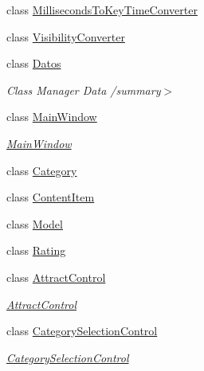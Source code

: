 \begin{DoxyCompactItemize}
\item 
class \hyperlink{class_microsoft_1_1_samples_1_1_kinect_1_1_basic_interactions_1_1_milliseconds_to_key_time_converter}{Milliseconds\-To\-Key\-Time\-Converter}
\item 
class \hyperlink{class_microsoft_1_1_samples_1_1_kinect_1_1_basic_interactions_1_1_visibility_converter}{Visibility\-Converter}
\item 
class \hyperlink{class_microsoft_1_1_samples_1_1_kinect_1_1_basic_interactions_1_1_datos}{Datos}
\begin{DoxyCompactList}\small\item\em Class Manager Data /summary$>$ \end{DoxyCompactList}\item 
class \hyperlink{class_microsoft_1_1_samples_1_1_kinect_1_1_basic_interactions_1_1_main_window}{Main\-Window}
\begin{DoxyCompactList}\small\item\em \hyperlink{class_microsoft_1_1_samples_1_1_kinect_1_1_basic_interactions_1_1_main_window}{Main\-Window} \end{DoxyCompactList}\item 
class \hyperlink{class_microsoft_1_1_samples_1_1_kinect_1_1_basic_interactions_1_1_category}{Category}
\item 
class \hyperlink{class_microsoft_1_1_samples_1_1_kinect_1_1_basic_interactions_1_1_content_item}{Content\-Item}
\item 
class \hyperlink{class_microsoft_1_1_samples_1_1_kinect_1_1_basic_interactions_1_1_model}{Model}
\item 
class \hyperlink{class_microsoft_1_1_samples_1_1_kinect_1_1_basic_interactions_1_1_rating}{Rating}
\item 
class \hyperlink{class_microsoft_1_1_samples_1_1_kinect_1_1_basic_interactions_1_1_attract_control}{Attract\-Control}
\begin{DoxyCompactList}\small\item\em \hyperlink{class_microsoft_1_1_samples_1_1_kinect_1_1_basic_interactions_1_1_attract_control}{Attract\-Control} \end{DoxyCompactList}\item 
class \hyperlink{class_microsoft_1_1_samples_1_1_kinect_1_1_basic_interactions_1_1_category_selection_control}{Category\-Selection\-Control}
\begin{DoxyCompactList}\small\item\em \hyperlink{class_microsoft_1_1_samples_1_1_kinect_1_1_basic_interactions_1_1_category_selection_control}{Category\-Selection\-Control} \end{DoxyCompactList}\item 

\end{DoxyCompactItemize}
